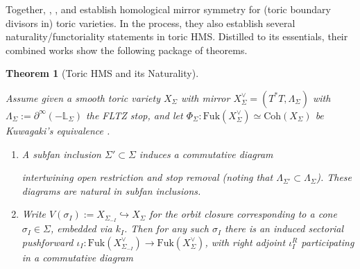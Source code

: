 \documentclass[11pt]{amsart}
\newtheorem{thm}{Theorem}[section]
\theoremstyle{definition}
\theoremstyle{remark}
\newcommand{\Coh}{\mathrm{Coh}}
\newcommand{\Fuk}{\mathrm{Fuk}}
\numberwithin{equation}{section}
\begin{document}
Together, \cite{FLTZ}, \cite{Kuwagaki}, and \cite{gammage2022mirror} establish homological mirror symmetry for (toric boundary divisors in) toric varieties. In the process, they also establish several naturality/functoriality statements in toric HMS. Distilled to its essentials, their combined works show the following package of theorems.

\begin{thm}[Toric HMS and its Naturality]\label{toric HMS natural}

Assume given a smooth toric variety $X_\Sigma$ with mirror $X_\Sigma^\vee = (T^*T,\Lambda_\Sigma)$ with $\Lambda_\Sigma:=\partial^\infty(-\mathbb{L}_\Sigma)$ the FLTZ stop, and let $\Phi_\Sigma \colon \Fuk(X^\vee_\Sigma) \simeq \Coh(X_\Sigma)$ be Kuwagaki’s equivalence \cite{Kuwagaki}.

\begin{enumerate}
    \item A subfan inclusion $\Sigma' \subset \Sigma$ induces a commutative diagram \begin{center}
\end{center}
intertwining open restriction and stop removal (noting that $\Lambda_{\Sigma'} \subset \Lambda_{\Sigma}$). These diagrams are natural in subfan inclusions.

\item Write $V(\sigma_I) := X_{\Sigma_{-I}}\hookrightarrow X_\Sigma$ for the orbit closure corresponding to a cone $\sigma_I \in \Sigma$, embedded via $k_I$. Then for any such $\sigma_I$ there is an induced sectorial pushforward $\iota_I: \Fuk(X^\vee_{\Sigma_{-I}})\to \Fuk(X^\vee_\Sigma)$, with right adjoint $\iota_I^R$ participating in a commutative diagram 
\begin{center}
\end{center}


\end{enumerate}
\end{thm}
\end{document}

